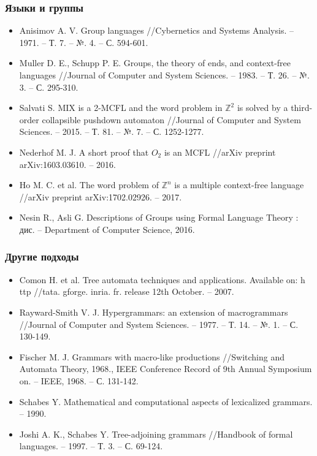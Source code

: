 \documentclass{beamer}
\begin{document}
\begin{frame}[fragile]
  \transwipe[direction=90]
  \frametitle{Языки и группы}
  \begin{itemize}
    \item Anisimov A. V. Group languages //Cybernetics and Systems Analysis. – 1971. – Т. 7. – №. 4. – С. 594-601.
    \item Muller D. E., Schupp P. E. Groups, the theory of ends, and context-free languages //Journal of Computer and System Sciences. – 1983. – Т. 26. – №. 3. – С. 295-310.
    \item Salvati S. MIX is a 2-MCFL and the word problem in $\mathbb {Z}^ 2$ is solved by a third-order collapsible pushdown automaton //Journal of Computer and System Sciences. – 2015. – Т. 81. – №. 7. – С. 1252-1277.
    \item Nederhof M. J. A short proof that $ O_2 $ is an MCFL //arXiv preprint arXiv:1603.03610. – 2016.
    \item Ho M. C. et al. The word problem of $\mathbb {Z}^ n $ is a multiple context-free language //arXiv preprint arXiv:1702.02926. – 2017.
    \item Nesin R., Asli G. Descriptions of Groups using Formal Language Theory : дис. – Department of Computer Science, 2016.
  \end{itemize}
\end{frame}

\begin{frame}[fragile]
  \transwipe[direction=90]
  \frametitle{Другие подходы}
  \begin{itemize}
    \item Comon H. et al. Tree automata techniques and applications. Available on: h ttp //tata. gforge. inria. fr. release 12th October. – 2007.
    \item Rayward-Smith V. J. Hypergrammars: an extension of macrogrammars //Journal of Computer and System Sciences. – 1977. – Т. 14. – №. 1. – С. 130-149.
    \item Fischer M. J. Grammars with macro-like productions //Switching and Automata Theory, 1968., IEEE Conference Record of 9th Annual Symposium on. – IEEE, 1968. – С. 131-142.
    \item Schabes Y. Mathematical and computational aspects of lexicalized grammars. – 1990.
    \item Joshi A. K., Schabes Y. Tree-adjoining grammars //Handbook of formal languages. – 1997. – Т. 3. – С. 69-124.
  \end{itemize}
\end{frame}
\end{document}
